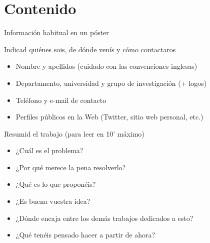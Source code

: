 \documentclass[xcolor=svgnames,compress]{beamer}
\begin{document}
\section{Contenido}

\begin{frame}{Información habitual en un póster}

  \begin{block}{Indicad quiénes sois, de dónde venís y cómo contactaros}
    \begin{itemize}
    \item Nombre y apellidos (cuidado con las convenciones inglesas)
    \item Departamento, universidad y grupo de investigación (+ logos)
    \item Teléfono y e-mail de contacto
    \item Perfiles públicos en la Web (Twitter, sitio web personal, etc.)
    \end{itemize}
  \end{block}

  \begin{block}{Resumid el trabajo (para leer en 10' máximo)}
    \begin{itemize}
    \item ¿Cuál es el problema?
    \item ¿Por qué merece la pena resolverlo?
    \item ¿Qué es lo que proponéis?
    \item ¿Es buena vuestra idea?
    \item ¿Dónde encaja entre los demás trabajos dedicados a esto?
    \item ¿Qué tenéis pensado hacer a partir de ahora?
    \end{itemize}
  \end{block}

\end{frame}
\end{document}
